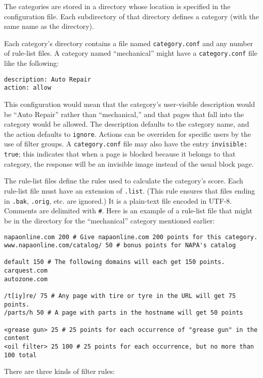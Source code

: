 \documentclass{article}
\begin{document}
The categories are stored in a directory whose location is specified in the configuration file. 
Each subdirectory of that directory defines a category (with the same name as the directory). 

Each category's directory contains a file named \verb"category.conf" and any number of rule-list files. 
A category named ``mechanical'' might have a \verb"category.conf" file like the following:

\begin{verbatim}
description: Auto Repair
action: allow
\end{verbatim}

This configuration would mean that the category's user-visible description would be 
``Auto Repair'' rather than ``mechanical,'' and that pages that fall into the category would be allowed. 
The description defaults to the category name, and the action 
defaults to \verb"ignore". Actions can be overriden for specific users by the use of filter groups.
A \verb"category.conf" file may also have the entry \verb"invisible: true"; 
this indicates that when a page is blocked because it belongs to that category,
the response will be an invisible image instead of the usual block page.

The rule-list files define the rules used to calculate the category's score. 
Each rule-list file must have an extension of \verb".list". 
(This rule ensures that files ending in \verb".bak", \verb".orig", etc. are ignored.) 
It is a plain-text file encoded in UTF-8. Comments are delimited with \verb"#". 
Here is an example of a rule-list file that might be in the directory for the 
``mechanical'' category mentioned earlier:

\begin{verbatim}
napaonline.com 200 # Give napaonline.com 200 points for this category.
www.napaonline.com/catalog/ 50 # bonus points for NAPA's catalog

default 150 # The following domains will each get 150 points.
carquest.com
autozone.com

/t[iy]re/ 75 # Any page with tire or tyre in the URL will get 75 points.
/parts/h 50 # A page with parts in the hostname will get 50 points

<grease gun> 25 # 25 points for each occurrence of "grease gun" in the content
<oil filter> 25 100 # 25 points for each occurrence, but no more than 100 total
\end{verbatim}

There are three kinds of filter rules:
\end{document}
